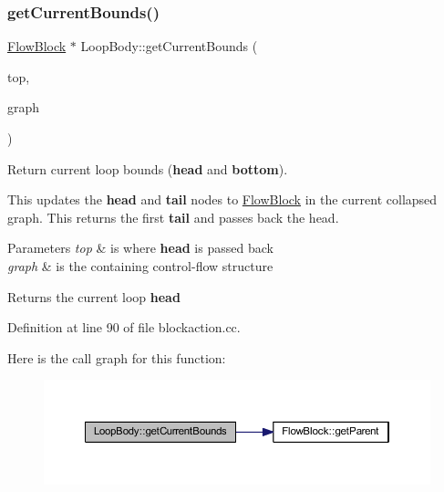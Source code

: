 \subsubsection{\texorpdfstring{getCurrentBounds()}{getCurrentBounds()}}
{\footnotesize\ttfamily \mbox{\hyperlink{class_flow_block}{Flow\+Block}} $\ast$ Loop\+Body\+::get\+Current\+Bounds (\begin{DoxyParamCaption}\item[{\mbox{\hyperlink{class_flow_block}{Flow\+Block}} $\ast$$\ast$}]{top,  }\item[{\mbox{\hyperlink{class_flow_block}{Flow\+Block}} $\ast$}]{graph }\end{DoxyParamCaption})}



Return current loop bounds ({\bfseries{head}} and {\bfseries{bottom}}). 

This updates the {\bfseries{head}} and {\bfseries{tail}} nodes to \mbox{\hyperlink{class_flow_block}{Flow\+Block}} in the current collapsed graph. This returns the first {\bfseries{tail}} and passes back the head. 
\begin{DoxyParams}{Parameters}
{\em top} & is where {\bfseries{head}} is passed back \\
\hline
{\em graph} & is the containing control-\/flow structure \\
\hline
\end{DoxyParams}
\begin{DoxyReturn}{Returns}
the current loop {\bfseries{head}} 
\end{DoxyReturn}


Definition at line 90 of file blockaction.\+cc.

Here is the call graph for this function\+:
\nopagebreak
\begin{figure}[H]
\begin{center}
\leavevmode
\includegraphics[width=350pt]{class_loop_body_a5c34d8675c1290e7b3ad25d602f6d52e_cgraph}
\end{center}
\end{figure}
\mbox{\label{class_loop_body_a048c534410554e124bbc25616661cdf1}} 
